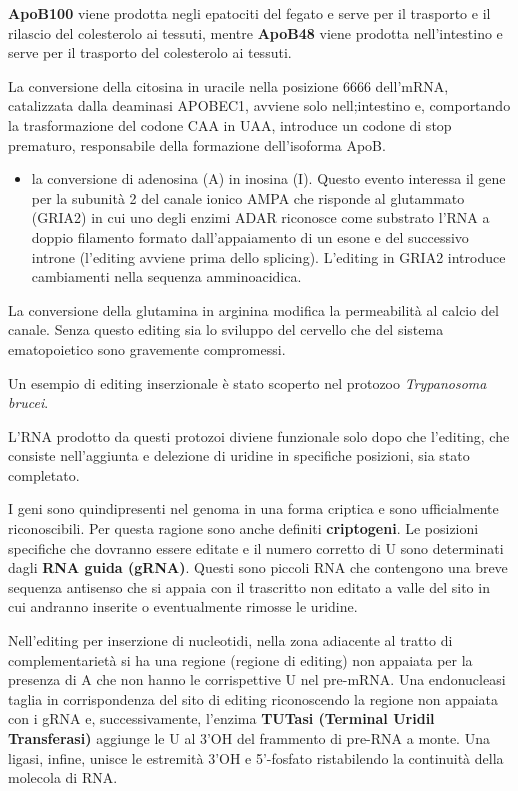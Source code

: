 \documentclass[11pt]{book}
\begin{document}
\textbf{ApoB100} viene prodotta negli epatociti del fegato e serve per
il trasporto e il rilascio del colesterolo ai tessuti, mentre
\textbf{ApoB48} viene prodotta nell'intestino e serve per il trasporto
del colesterolo ai tessuti.

La conversione della citosina in uracile nella posizione 6666 dell'mRNA,
catalizzata dalla deaminasi APOBEC1, avviene solo nell;intestino e,
comportando la trasformazione del codone CAA in UAA, introduce un codone
di stop prematuro, responsabile della formazione dell'isoforma ApoB.

\begin{itemize}
\itemsep1pt\parskip0pt
\item
  la conversione di adenosina (A) in inosina (I). Questo evento
  interessa il gene per la subunità 2 del canale ionico AMPA che
  risponde al glutammato (GRIA2) in cui uno degli enzimi ADAR riconosce
  come substrato l'RNA a doppio filamento formato dall'appaiamento di un
  esone e del successivo introne (l'editing avviene prima dello
  splicing). L'editing in GRIA2 introduce cambiamenti nella sequenza
  amminoacidica.
\end{itemize}

La conversione della glutamina in arginina modifica la permeabilità al
calcio del canale. Senza questo editing sia lo sviluppo del cervello che
del sistema ematopoietico sono gravemente compromessi.

Un esempio di editing inserzionale è stato scoperto nel protozoo
\emph{Trypanosoma brucei}.

L'RNA prodotto da questi protozoi diviene funzionale solo dopo che
l'editing, che consiste nell'aggiunta e delezione di uridine in
specifiche posizioni, sia stato completato.

I geni sono quindipresenti nel genoma in una forma criptica e sono
ufficialmente riconoscibili. Per questa ragione sono anche definiti
\textbf{criptogeni}. Le posizioni specifiche che dovranno essere editate
e il numero corretto di U sono determinati dagli \textbf{RNA guida
(gRNA)}. Questi sono piccoli RNA che contengono una breve sequenza
antisenso che si appaia con il trascritto non editato a valle del sito
in cui andranno inserite o eventualmente rimosse le uridine.

Nell'editing per inserzione di nucleotidi, nella zona adiacente al
tratto di complementarietà si ha una regione (regione di editing) non
appaiata per la presenza di A che non hanno le corrispettive U nel
pre-mRNA. Una endonucleasi taglia in corrispondenza del sito di editing
riconoscendo la regione non appaiata con i gRNA e, successivamente,
l'enzima \textbf{TUTasi (Terminal Uridil Transferasi)} aggiunge le U al
3'OH del frammento di pre-RNA a monte. Una ligasi, infine, unisce le
estremità 3'OH e 5'-fosfato ristabilendo la continuità della molecola di
RNA.
\end{document}
